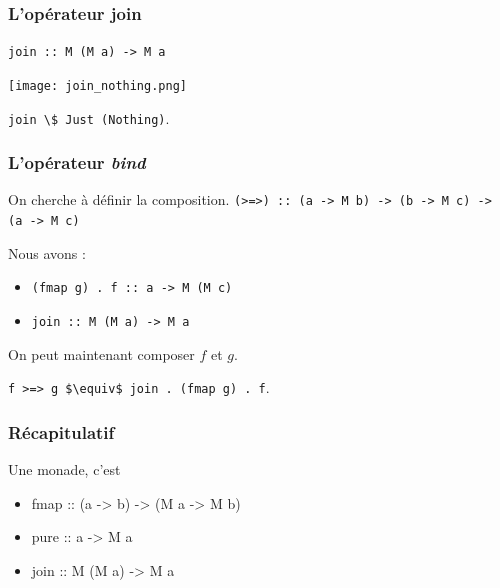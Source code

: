 \documentclass{beamer}
\begin{document}
\begin{frame}
\frametitle{L'opérateur join}
\begin{block}{}
\begin{center}
\verb!join :: M (M a) -> M a!
\end{center}
\end{block}
\medskip
\begin{center}
\texttt{[image: join\_nothing.png]}
\end{center}
\medskip
\pause
\begin{exampleblock}{}
\begin{center}
\verb!join \$ Just (Nothing)!.
\end{center}
\end{exampleblock}
\end{frame}



\begin{frame}
\frametitle{L'opérateur \emph{bind}}
\begin{block}{On cherche à définir la composition.}
\verb!(>=>) :: (a -> M b) -> (b -> M c) -> (a -> M c)!
\end{block}

\pause

\begin{block}{Nous avons :}
\begin{itemize}
\item \verb!(fmap g) . f :: a -> M (M c)!
\item \verb!join :: M (M a) -> M a!
\end{itemize}
\end{block}
\pause

\begin{block}{On peut maintenant composer $f$ et $g$.}

\verb!f >=> g $\equiv$ join . (fmap g) . f!.
\end{block}
\end{frame}

\begin{frame}
\frametitle{Récapitulatif}

\begin{block}{Une monade, c'est}

	\begin{itemize}
		\item fmap :: (a -> b) -> (M a -> M b)
		\item pure :: a -> M a
		\item join :: M (M a) -> M a
	\end{itemize}

\end{block}

\end{frame}
\end{document}
